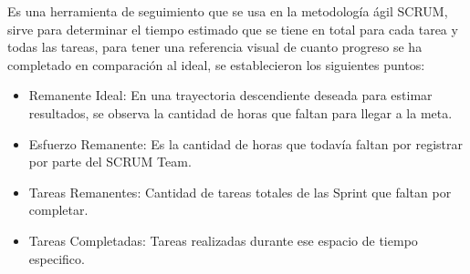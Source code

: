 Es una herramienta de seguimiento que se usa en la metodología ágil SCRUM, sirve para determinar el tiempo estimado que se tiene en total para cada tarea y todas las tareas, para tener una referencia visual de cuanto progreso se ha completado en comparación al ideal, se establecieron los siguientes puntos:

\begin{itemize}
	\item Remanente Ideal: En una trayectoria descendiente deseada para estimar resultados, se observa la cantidad de horas que faltan para  llegar a la meta.
	\item Esfuerzo Remanente: Es la cantidad de horas que todavía faltan por registrar por parte del SCRUM Team.
	\item Tareas Remanentes: Cantidad de tareas totales de las Sprint que faltan por completar.
	\item Tareas Completadas: Tareas realizadas durante ese espacio de tiempo especifico. 
\end{itemize}
				




